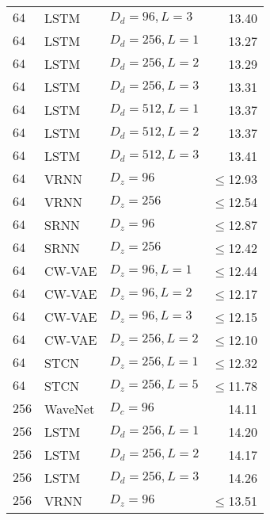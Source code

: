 {\begin{table}[p]
{\begin{tabular}{ll|lr}
        $64$      & LSTM                & $D_d=96, L=3$         & 13.40 \\
        $64$      & LSTM                & $D_d=256, L=1$        & 13.27 \\
        $64$      & LSTM                & $D_d=256, L=2$        & 13.29 \\
        $64$      & LSTM                & $D_d=256, L=3$        & 13.31 \\
        $64$      & LSTM                & $D_d=512, L=1$        & 13.37 \\
        $64$      & LSTM                & $D_d=512, L=2$        & 13.37 \\
        $64$      & LSTM                & $D_d=512, L=3$        & 13.41 \\
        $64$      & VRNN                & $D_z=96$              & $\leq$12.93 \\
        $64$      & VRNN                & $D_z=256$             & $\leq$12.54 \\
        $64$      & SRNN                & $D_z=96$              & $\leq$12.87 \\
        $64$      & SRNN                & $D_z=256$             & $\leq$12.42 \\
        $64$      & CW-VAE              & $D_z=96, L=1$         & $\leq$12.44 \\
        $64$      & CW-VAE              & $D_z=96, L=2$         & $\leq$12.17 \\
        $64$      & CW-VAE              & $D_z=96, L=3$         & $\leq$12.15 \\
        $64$      & CW-VAE              & $D_z=256, L=2$        & $\leq$12.10 \\
        $64$ & STCN               & $D_z=256,L=1$               & $\leq$12.32 \\  %
        $64$ & STCN               & $D_z=256,L=5$               & $\leq$11.78 \\
        \midrule
        $256$     & WaveNet             & $D_c=96$              & 14.11 \\
        $256$     & LSTM                & $D_d=256, L=1$        & 14.20 \\
        $256$     & LSTM                & $D_d=256, L=2$        & 14.17 \\
        $256$     & LSTM                & $D_d=256, L=3$        & 14.26 \\
        $256$     & VRNN                & $D_z=96$              & $\leq$13.51 \\

\end{tabular}}
\end{table}}
